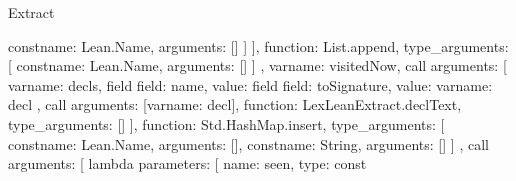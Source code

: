 \begin{lexlean}{Extract}
\begin{toolingmodule}
{{{{{{{{{{{{{{{{{{{{                                                          const{name: Lean.Name, arguments: []}
                                                        ]
                                                      }
                                                    ],
                                                    function: List.append,
                                                    type_arguments: [
                                                      const{name: Lean.Name, arguments: []}
                                                    ]
                                                  },
                                                  var{name: visitedNow},
                                                  call{
                                                    arguments: [
                                                      var{name: decls},
                                                      field{
                                                        field: name,
                                                        value: field{
                                                          field: toSignature,
                                                          value: var{name: decl}
                                                        }
                                                      },
                                                      call{
                                                        arguments: [var{name: decl}],
                                                        function: LexLeanExtract.declText,
                                                        type_arguments: []
                                                      }
                                                    ],
                                                    function: Std.HashMap.insert,
                                                    type_arguments: [
                                                      const{name: Lean.Name, arguments: []},
                                                      const{name: String, arguments: []}
                                                    ]
                                                  },
                                                  call{
                                                    arguments: [
                                                      lambda{
                                                        parameters: [
                                                          {
                                                            name: seen,
                                                            type: const{
}}}}}}}}}}}}}}}}}}}}}}
\end{toolingmodule}
\end{lexlean}
